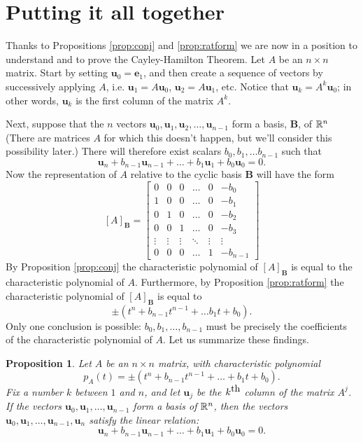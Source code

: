 \documentclass[12pt]{article}
\newcommand{\vu}{\mathbf{u}}
\newcommand{\ve}{\mathbf{e}}
\newcommand{\bB}{{\mathbf{B}}}
\newcommand{\lp}{\left(}
\newcommand{\rp}{\right)}
\newcommand{\lb}{\left[}
\newcommand{\rb}{\right]}
\newcommand{\reals}{{\Bbb R}}
\newtheorem{proposition}{Proposition}
\begin{document}
\section{Putting it all together}

 Thanks to Propositions \ref{prop:conj} and \ref{prop:ratform} we are
 now in a position to understand and to prove the
 Cayley-Hamilton Theorem.  Let $A$ be an $n\times n$ matrix.  Start by
 setting $\vu_0=\ve_1$, and then create a sequence of vectors by
 successively applying $A$, i.e. $\vu_1=A\vu_0$, $\vu_2=A\vu_1$, etc.
 Notice that $\vu_k=A^k \vu_0$; in other words, $\vu_k$ is the first
 column of the matrix $A^k$.

 
 Next, suppose that the $n$ vectors $\vu_0, \vu_1, \vu_2,\ldots ,
 \vu_{n-1}$ form a basis, $\bB$, of $\reals^n$ (There are matrices $A$
 for which this doesn't happen, but we'll consider this possibility
 later.)  There will therefore exist scalars $b_0,b_1,\ldots b_{n-1}$
 such that
 $$\vu_n + b_{n-1} \vu_{n-1} + \ldots + b_1 \vu_1 + b_0 \vu_0 = 0.$$
 Now the representation of $A$ relative to the cyclic basis $\bB$ will
 have the form
 $$
 [A]_\bB=
 \lb\begin{array}{cccccc}
 0 & 0 & 0 & \ldots & 0 & -b_0 \\
 1 & 0 & 0 & \ldots & 0 & -b_1 \\
 0 & 1 & 0 & \ldots & 0 & -b_2 \\
 0 & 0 & 1 & \ldots & 0 & -b_3 \\
 \vdots & \vdots & \vdots &  \ddots & \vdots & \vdots \\
 0 & 0 & 0 & \ldots & 1 & -b_{n-1}
 \end{array}\rb
 $$
By Proposition \ref{prop:conj} the characteristic polynomial of
$[A]_\bB$ is equal to the characteristic polynomial of $A$.
Furthermore, by Proposition \ref{prop:ratform} the characteristic
polynomial of $[A]_\bB$ is equal to 
$$\pm(t^n+b_{n-1}t^{n-1} + \ldots b_1 t + b_0).$$
Only one conclusion
is possible: $b_0, b_1, \ldots , b_{n-1}$ must be precisely the
coefficients of the characteristic polynomial of $A$.  Let us
summarize these findings.
\begin{proposition}
\label{prop:cols}
  Let $A$ be an $n\times n$ matrix, with characteristic polynomial
  $$p_A(t)=\pm \lp t^n+b_{n-1}t^{n-1} + \ldots + b_1 t + b_0\rp.$$
  Fix a
  number $k$ between $1$ and $n$, and let $\vu_j$ be the $k^{\mbox{\rm
      th}}$ column of the matrix $A^j$.  If the vectors
  $\vu_0,\vu_1,\ldots, \vu_{n-1}$ form a basis of $\reals^n$, then
  the vectors $\vu_0,\vu_1,\ldots, \vu_{n-1}, \vu_n$ satisfy the
  linear relation:
  $$\vu_n+b_{n-1}\vu_{n-1} + \ldots + b_1 \vu_1 + b_0\vu_0=0.$$
\end{proposition}
\end{document}
